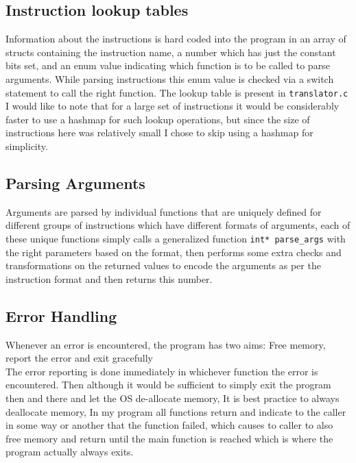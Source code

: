 \documentclass[12pt]{article}
\begin{document}
    \subsection{Instruction lookup tables}
    Information about the instructions is hard coded into the program in an array of structs containing the instruction name, a number which has just the  constant bits set, and an enum value indicating which function is to be called to parse arguments. While parsing instructions this enum value is checked via a switch statement to call the right function. The lookup table is present in \verb#translator.c#
    \\

    I would like to note that for a large set of instructions it would be considerably faster to use a hashmap for such lookup operations, but since the size of instructions here was relatively small I chose to skip using a hashmap for simplicity.

    \subsection{Parsing Arguments}
    Arguments are parsed by individual functions that are uniquely defined for different groups of instructions which have different formats of arguments, each of these unique functions simply calls a generalized function \verb#int* parse_args# with the right parameters based on the format, then performs some extra checks and transformations on the returned values to encode the arguments as per the instruction format and then returns this number.

    \subsection{Error Handling}
    Whenever an error is encountered, the program has two aims: Free memory, report the error and exit gracefully
    \\

    The error reporting is done immediately in whichever function the error is encountered. Then although it would be sufficient to simply exit the program then and there and let the OS de-allocate memory, It is best practice to always deallocate memory, In my program all functions return and indicate to the caller in some way or another that the function failed, which causes to caller to also free memory and return until the main function is reached which is where the program actually always exits.\\
\end{document}
